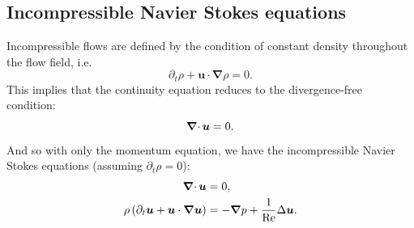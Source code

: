 \documentclass{article}
\begin{document}
\subsection{Incompressible Navier Stokes equations}
Incompressible flows are defined by the condition of constant density throughout the flow field, i.e.
\[\partial_t \rho + \bm{u} \cdot \bm{\nabla} \rho = 0.\]
This implies that the continuity equation reduces to the divergence-free condition:
\[\operatorname{\boldsymbol{\mathrm{\nabla}}\cdot} \bm{u} = 0.\]
And so with only the momentum equation, we have the incompressible Navier Stokes equations (assuming $\partial_t \rho = 0$):
\begin{align*}
	\operatorname{\boldsymbol{\mathrm{\nabla}}\cdot} \bm{u}                                                          & = 0,                                              \\
	\rho\left(\partial_{t} \bm{u} + \bm{u}\cdot \bm{\nabla} \bm{u}\right) & = - \bm{\nabla} p + \frac{1}{\mathrm{Re}} \Delta \bm{u}.
\end{align*}
\end{document}
